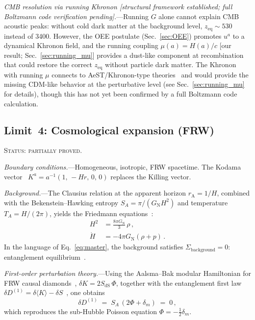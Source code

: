 \documentclass[prd,twocolumn,superscriptaddress,longbibliography,floatfix]{revtex4-2}
\newcommand{\GN}{G_{\mathrm{N}}}
\newcommand{\SdS}{S_{\mathrm{dS}}}
\newcommand{\rA}{r_{\mathrm{A}}}
\begin{document}
\emph{CMB resolution via running Khronon
[structural framework established; full Boltzmann code
verification pending].}---Running $G$ alone cannot
explain CMB acoustic peaks: without cold dark matter at
the background level, $z_{\mathrm{eq}} \sim 530$ instead
of 3400.  However, the OEE postulate
(Sec.~\ref{sec:OEE}) promotes $u^a$ to a dynamical
Khronon field, and the running coupling $\mu(a) = H(a)/c$
[our result; Sec.~\ref{sec:running_mu}] provides a
dust-like component at recombination that could restore
the correct $z_{\mathrm{eq}}$ without particle dark
matter.  The Khronon with running $\mu$ connects to
AeST/Khronon-type
theories~\cite{SkordisZlosnik2021,BlanchetSkordis2024}
and would provide the missing CDM-like behavior at the
perturbative level (see Sec.~\ref{sec:running_mu} for
details), though this has not yet been confirmed by a
full Boltzmann code calculation.


\subsection{Limit~4: Cosmological expansion (FRW)}
\label{sec:limit_cosmo}

\textsc{Status: partially proved.}

\emph{Boundary conditions.}---Homogeneous, isotropic,
FRW spacetime.  The Kodama vector~\cite{Kodama1980}
$K^a = a^{-1}(1,\,-Hr,\,0,\,0)$ replaces the Killing
vector.

\emph{Background.}---The Clausius relation at the apparent
horizon $\rA = 1/H$, combined with the
Bekenstein--Hawking entropy $S_A = \pi/(\GN H^2)$ and
temperature $T_A = H/(2\pi)$, yields the Friedmann
equations~\cite{CaiKim2005,Jacobson1995}:
\begin{align}
H^2 &= \frac{8\pi\GN}{3}\,\rho\,,
\label{eq:friedmann1}\\
\dot{H} &= -4\pi\GN(\rho + p)\,.
\label{eq:friedmann2}
\end{align}
In the language of Eq.~\eqref{eq:master}, the background
satisfies $\Sigma_{\mathrm{background}} = 0$:
entanglement equilibrium~\cite{Jacobson2016}.

\emph{First-order perturbation theory.}---Using the
Aalsma--Bak modular Hamiltonian for FRW causal
diamonds~\cite{AalsmaBak2025},
$\delta K = 2\SdS\,\Phi$, together with the entanglement
first law $\delta D^{(1)} = \delta\langle K\rangle
- \delta S$~\cite{Faulkner2014}, one obtains
\begin{equation}
\delta D^{(1)} \;=\; S_A\,(2\Phi + \delta_m) \;=\; 0\,,
\label{eq:first_order_D}
\end{equation}
which reproduces the sub-Hubble Poisson equation
$\Phi = -\tfrac{1}{2}\delta_m$.
\end{document}
